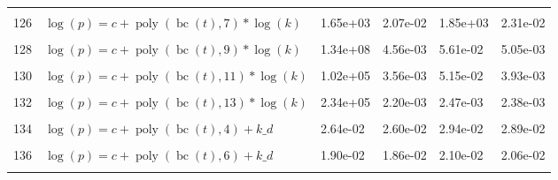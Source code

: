\documentclass[12pt,a4paper]{article}
\DeclareMathOperator{\bc}{bc}
\DeclareMathOperator{\poly}{poly}
\begin{document}
\begin{longtable}[t]{ll>{\raggedleft\arraybackslash}p{2cm}>{\raggedleft\arraybackslash}p{2cm}>{\raggedleft\arraybackslash}p{2cm}>{\raggedleft\arraybackslash}p{2cm}}
\cellcolor{gray!6}{125} & \cellcolor{gray!6}{$\log(p) = c + \poly\left( \bc(t), 6 \right) * \log(k)$} & \cellcolor{gray!6}{8.44e-03} & \cellcolor{gray!6}{7.39e-03} & \cellcolor{gray!6}{9.42e-03} & \cellcolor{gray!6}{8.23e-03}\\
126 & $\log(p) = c + \poly\left( \bc(t), 7 \right) * \log(k)$ & 1.65e+03 & 2.07e-02 & 1.85e+03 & 2.31e-02\\
\cellcolor{gray!6}{127} & \cellcolor{gray!6}{$\log(p) = c + \poly\left( \bc(t), 8 \right) * \log(k)$} & \cellcolor{gray!6}{1.71e+02} & \cellcolor{gray!6}{1.46e-02} & \cellcolor{gray!6}{2.13e-02} & \cellcolor{gray!6}{1.63e-02}\\
128 & $\log(p) = c + \poly\left( \bc(t), 9 \right) * \log(k)$ & 1.34e+08 & 4.56e-03 & 5.61e-02 & 5.05e-03\\
\cellcolor{gray!6}{129} & \cellcolor{gray!6}{$\log(p) = c + \poly\left( \bc(t), 10 \right) * \log(k)$} & \cellcolor{gray!6}{8.47e+07} & \cellcolor{gray!6}{2.58e-03} & \cellcolor{gray!6}{3.04e-03} & \cellcolor{gray!6}{2.82e-03}\\
130 & $\log(p) = c + \poly\left( \bc(t), 11 \right) * \log(k)$ & 1.02e+05 & 3.56e-03 & 5.15e-02 & 3.93e-03\\
\cellcolor{gray!6}{131} & \cellcolor{gray!6}{$\log(p) = c + \poly\left( \bc(t), 12 \right) * \log(k)$} & \cellcolor{gray!6}{9.07e+02} & \cellcolor{gray!6}{3.16e-03} & \cellcolor{gray!6}{7.47e-03} & \cellcolor{gray!6}{3.47e-03}\\
132 & $\log(p) = c + \poly\left( \bc(t), 13 \right) * \log(k)$ & 2.34e+05 & 2.20e-03 & 2.47e-03 & 2.38e-03\\
\cellcolor{gray!6}{133} & \cellcolor{gray!6}{$\log(p) = c + \poly\left( \bc(t), 3 \right) + k\_d$} & \cellcolor{gray!6}{2.67e-02} & \cellcolor{gray!6}{2.05e-02} & \cellcolor{gray!6}{2.97e-02} & \cellcolor{gray!6}{2.27e-02}\\
134 & $\log(p) = c + \poly\left( \bc(t), 4 \right) + k\_d$ & 2.64e-02 & 2.60e-02 & 2.94e-02 & 2.89e-02\\
\cellcolor{gray!6}{135} & \cellcolor{gray!6}{$\log(p) = c + \poly\left( \bc(t), 5 \right) + k\_d$} & \cellcolor{gray!6}{2.10e-02} & \cellcolor{gray!6}{1.85e-02} & \cellcolor{gray!6}{2.33e-02} & \cellcolor{gray!6}{2.05e-02}\\
136 & $\log(p) = c + \poly\left( \bc(t), 6 \right) + k\_d$ & 1.90e-02 & 1.86e-02 & 2.10e-02 & 2.06e-02\\
\cellcolor{gray!6}{137} & \cellcolor{gray!6}{$\log(p) = c + \poly\left( \bc(t), 7 \right) + k\_d$} & \cellcolor{gray!6}{1.43e+00} & \cellcolor{gray!6}{2.40e-02} & \cellcolor{gray!6}{1.60e+00} & \cellcolor{gray!6}{2.66e-02}\\

\end{longtable}
\end{document}
